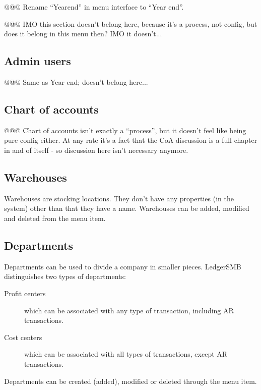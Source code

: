 @@@ Rename ``Yearend'' in menu interface to ``Year end''.


@@@ IMO this section doesn't belong here, because it's a process, not config, but does it belong in this menu then? IMO it doesn't...


\subsection{Admin users}
\label{subsec-company-config-admin-users}

@@@ Same as Year end; doesn't belong here...

\subsection{Chart of accounts}
\label{subsec-company-config-coa}

@@@ Chart of accounts isn't exactly a ``process'', but it doesn't feel like being pure
config either. At any rate it's a fact that the CoA discussion is a full chapter in and
of itself - so discussion here isn't necessary anymore.

\subsection{Warehouses}
\label{subsec-company-config-warehouses}

Warehouses are stocking locations. They don't have any properties (in the system)
other than that they have a name. Warehouses can be added, modified and deleted from
the  menu item.

\subsection{Departments}
\label{subsec-company-config-departments}

Departments can be used to divide a company in smaller pieces. LedgerSMB distinguishes two
types of departments:

\begin{description}
\item [Profit centers] which can be associated with any type of transaction, including AR transactions.
\item [Cost centers] which can be associated with all types of transactions, except AR transactions.
\end{description}

Departments can be created (added), modified or deleted through the  menu item.

